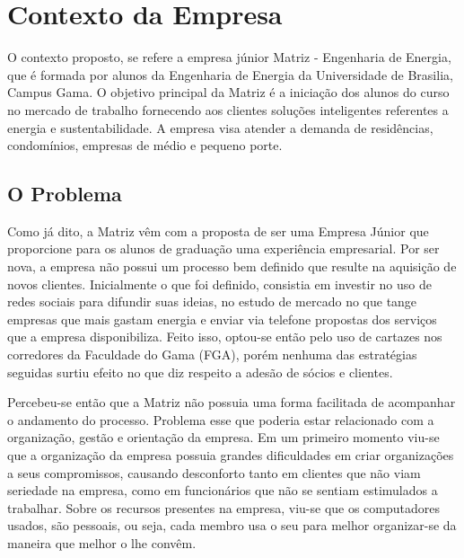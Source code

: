 \chapter[Contexto da Empresa]{Contexto da Empresa}
O contexto proposto, se refere a empresa júnior Matriz - Engenharia de Energia, que é 
formada por alunos da Engenharia de Energia da Universidade de Brasilia, Campus Gama. 
O objetivo principal da Matriz é a iniciação dos alunos do curso no mercado de trabalho 
fornecendo aos clientes soluções inteligentes referentes a energia e sustentabilidade.
A empresa visa atender a demanda de residências, condomínios, empresas de médio 
e pequeno porte. 

\section{O Problema}
Como já dito, a Matriz vêm com a proposta de ser uma Empresa Júnior que proporcione para 
os alunos de graduação uma experiência empresarial. Por ser nova, a empresa não possui 
um processo bem definido que resulte na aquisição de novos clientes. Inicialmente o que 
foi definido, consistia em investir no uso de redes sociais para difundir suas ideias, 
no estudo de mercado no que tange empresas que mais gastam energia e enviar via telefone
propostas dos serviços que a empresa disponibiliza. Feito isso, optou-se então pelo uso de
cartazes nos corredores da Faculdade do Gama (FGA), porém nenhuma das estratégias seguidas
surtiu efeito no que diz respeito a adesão de sócios e clientes.

Percebeu-se então que a Matriz não possuia uma forma facilitada de acompanhar o andamento 
do processo. Problema esse que poderia estar relacionado com a organização, gestão e 
orientação da empresa. Em um primeiro momento viu-se que a 
organização da empresa possuia grandes dificuldades em criar organizações a seus compromissos, 
causando desconforto tanto em clientes que não viam seriedade na empresa, como em funcionários 
que não se sentiam estimulados a trabalhar. Sobre os recursos presentes na empresa, viu-se que 
os computadores usados, são pessoais, ou seja, cada membro usa o seu para melhor organizar-se 
da maneira que melhor o lhe convêm. 

